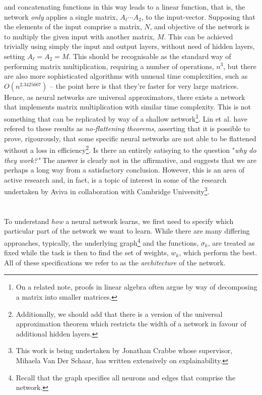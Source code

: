 \documentclass[11pt]{article}
\begin{document}
and concatenating functions in this way leads to a linear function, that is, the network \textit{only} applies a single matrix, $A_{\ell} \cdots A_{2}$, to the input-vector. Supposing that the elements of the input comprise a matrix, $N$, and objective of the network is to multiply the given input with another matrix, $M$. This can be achieved trivially using simply the input and output layers, without need of hidden layers, setting $A_{\ell} = A_{2} = M$. This should be recognisable as the standard way of performing matrix multiplication, requiring a number of operations, $n^{3}$, but there are also more sophisticated algorithms with unusual time complexities, such as $O(n^{2.3425667})$ – the point here is that they're faster for very large matrices. Hence, as neural networks are universal approximators, there exists a network that implements matrix multiplication with similar time complexity. This is not something that can be replicated by way of a shallow network\footnote{On a related note, proofs in linear algebra often argue by way of decomposing a matrix into smaller matrices.}. Lin et al. have refered to these results as \textit{no-flattening theorems}, asserting that it is possible to prove, rigourously, that some specific neural networks are not able to be flattened without a loss in efficiency\footnote{Additionally, we should add that there is a version of the universal approximation theorem which restricts the width of a network in favour of additional hidden layers.}. Is there an entirely satisying to the question "\textit{why do they work?"} The answer is clearly not in the affirmative, and suggests that we are perhaps a long way from a satisfactory conclusion. However, this is an area of active research and, in fact, is a topic of interest in some of the research undertaken by Aviva in collaboration with Cambridge University\footnote{This work is being undertaken by Jonathan Crabbe whose supervisor, Mihaela Van Der Schaar, has written extensively on explainability.}.

\section{}

To understand \textit{how} a neural network learns, we first need to specify which particular part of the network we want to learn. While there are many differing approaches, typically,  the underlying graph\footnote{Recall that the graph specifies all neurons and edges that comprise the network.} and the functions, $\sigma_{k}$, are treated as fixed while the task is then to find the set of weights, $w_{k}$, which perform the best. All of these specifications we refer to as the \textit{architecture} of the network.
\end{document}
